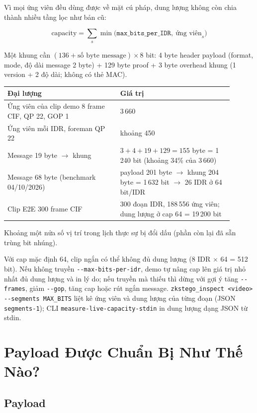 \documentclass[11pt,a4paper]{article}
\begin{document}
Vì mọi ứng viên đều dùng được về mặt cú pháp, dung lượng không còn chia thành nhiều
tầng lọc như bản cũ:

\[
  \text{capacity} = \sum_{s} \min\bigl(\texttt{max\_bits\_per\_IDR},\ \text{ứng viên}_s\bigr)
\]

Một khung cần \((136 + \text{số byte message}) \times 8\) bit: 4 byte header payload
(format, mode, độ dài message 2 byte) + 129 byte proof + 3 byte overhead khung
(1 version + 2 độ dài; không có thẻ MAC).

\begin{center}
\begin{tabular}{p{0.45\linewidth}p{0.45\linewidth}}
\toprule
Đại lượng & Giá trị \\
\midrule
Ứng viên của clip demo 8 frame CIF, QP 22, GOP 1 & 3\,660 \\
Ứng viên mỗi IDR, foreman QP 22 & khoảng 450 \\
Message 19 byte \(\rightarrow\) khung & \(3 + 4 + 19 + 129 = 155\) byte = 1\,240 bit (khoảng 34\% của 3\,660) \\
Message 68 byte (benchmark 04/10/2026) & payload 201 byte \(\rightarrow\) khung 204 byte = 1\,632 bit \(\rightarrow\) 26 IDR ở 64 bit/IDR \\
Clip E2E 300 frame CIF & 300 đoạn IDR, 188\,556 ứng viên; dung lượng ở cap 64 = 19\,200 bit \\
\bottomrule
\end{tabular}
\end{center}

Khoảng một nửa số vị trí trong lịch thực sự bị đổi dấu (phần còn lại đã sẵn trùng bit
nhúng).

Với cap mặc định 64, clip ngắn có thể không đủ dung lượng (8 IDR \(\times\) 64 =
512 bit). Nếu không truyền \texttt{-{}-max-bits-per-idr}, demo tự nâng cap lên giá
trị nhỏ nhất đủ dung lượng và in lý do; nếu truyền mà thiếu thì dừng với gợi ý
tăng \texttt{-{}-frames}, giảm \texttt{-{}-gop}, tăng cap hoặc rút ngắn message.
\texttt{zkstego\_inspect <video> -{}-segments MAX\_BITS} liệt kê ứng viên và dung
lượng của từng đoạn (JSON \texttt{segments-1}); CLI
\texttt{measure-live-capacity-stdin} in dung lượng dạng JSON từ stdin.

\section{Payload Được Chuẩn Bị Như Thế Nào?}

\subsection{Payload}
\end{document}
